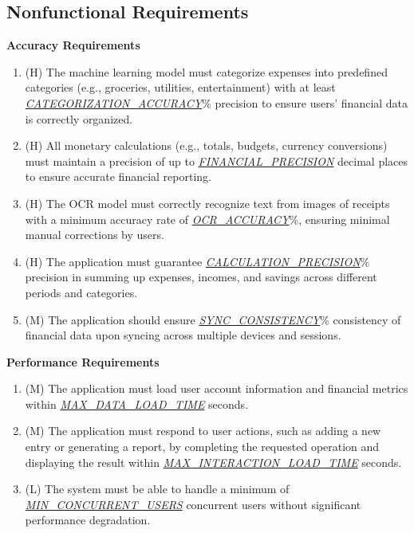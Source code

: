 \documentclass[12pt]{article}
\begin{document}
\newpage


\subsection{Nonfunctional Requirements}

\textbf{Accuracy Requirements}\label{NFR-ACC}
\begin{enumerate}[label=NFR-ACC-\arabic*]
  \item (H) The machine learning model must categorize expenses into predefined
  categories (e.g., groceries, utilities, entertainment) with at least
  \hyperref[Table:AuxConstants]{\textit{CATEGORIZATION\_ACCURACY}}\% precision
  to ensure users' financial data is correctly organized.
  \item (H) All monetary calculations (e.g., totals, budgets, currency
  conversions) must maintain a precision of up to
  \hyperref[Table:AuxConstants]{\textit{FINANCIAL\_PRECISION}} decimal places to
  ensure accurate financial reporting.
  \item (H) The OCR model must correctly recognize text from images of receipts
  with a minimum accuracy rate of
  \hyperref[Table:AuxConstants]{\textit{OCR\_ACCURACY}}\%, ensuring minimal
  manual corrections by users.
  \item (H) The application must guarantee
  \hyperref[Table:AuxConstants]{\textit{CALCULATION\_PRECISION}}\% precision in
  summing up expenses, incomes, and savings across different periods and
  categories.
  \item (M) The application should ensure
  \hyperref[Table:AuxConstants]{\textit{SYNC\_CONSISTENCY}}\% consistency of
  financial data upon syncing across multiple devices and sessions.
\end{enumerate}

\textbf{Performance Requirements}\label{NFR-PERF}
\begin{enumerate}[label=NFR-PERF-\arabic*]
  \item (M) The application must load user account information and financial
  metrics within \hyperref[Table:AuxConstants]{\textit{MAX\_DATA\_LOAD\_TIME}} seconds.
  \item (M) The application must respond to user actions, such as adding a new
  entry or generating a report, by completing the requested operation and
  displaying the result within
  \hyperref[Table:AuxConstants]{\textit{MAX\_INTERACTION\_LOAD\_TIME}} seconds.
  \item (L) The system must be able to handle a minimum of
  \hyperref[Table:AuxConstants]{\textit{MIN\_CONCURRENT\_USERS}} concurrent users
  without significant performance degradation.
\end{enumerate}
\end{document}
